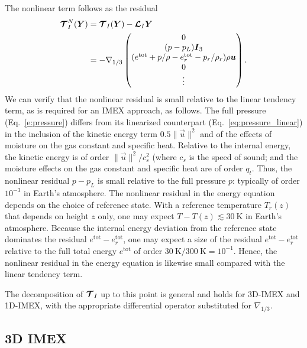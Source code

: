 \documentclass{report}
\begin{document}
The nonlinear term follows as the residual 
\begin{equation}\label{e:nonlinear_residual}
\begin{split}
\boldsymbol{{\mathcal{T}}}^N_{I}(\boldsymbol{{Y}}) & =  \boldsymbol{{\mathcal{T}}}_I(\boldsymbol{{Y}}) - \boldsymbol{{\mathcal{L}}}_I \boldsymbol{{Y}} \\
& = 
-\nabla_{1/3} \begin{pmatrix}
0 \\
(p - p_L) \boldsymbol{{I}}_3\\
(e^{\mathrm{tot}}  + p/\rho - e^{\mathrm{tot}}_r - p_r/\rho_r) \rho \boldsymbol{{u}}\\
0\\
\vdots
\end{pmatrix}.
\end{split}
\end{equation}
We can verify that the nonlinear residual is small relative to the linear tendency term, as is required for an IMEX approach, as follows. The full pressure (Eq.~\ref{e:pressure}) differs from its linearized counterpart (Eq.~\ref{eq:pressure_linear}) in the inclusion of the kinetic energy term $0.5 \|\vec{u} \|^2$ and of the effects of moisture on the gas constant and specific heat. Relative to the internal energy, the kinetic energy is of order $\|\vec{u}\|^2/c_s^2$ (where $c_s$ is the speed of sound; 
and the moisture effects on the gas constant and specific heat are of order $q_t$. Thus, the nonlinear residual $p-p_L$ is small relative to the full pressure $p$: typically of order $10^{-3}$ in Earth's atmosphere. The nonlinear residual in the energy equation depends on the choice of reference state. With a reference temperature $T_r(z)$ that depends on height $z$ only, one may expect $T - T(z) \lesssim 30~\mathrm{K}$ in Earth's atmosphere. Because the internal energy deviation from the reference state dominates the residual $e^{\mathrm{tot}} - e^{\mathrm{tot}}_r$, one may expect a size of the residual $e^{\mathrm{tot}} - e^{\mathrm{tot}}_r$ relative to the full total energy $e^{\mathrm{tot}}$ of order $30~\mathrm{K}/300~\mathrm{K} = 10^{-1}$. Hence, the nonlinear residual in the energy equation is likewise small compared with the linear tendency term. 
 
The decomposition of $\boldsymbol{{\mathcal{T}}}_I$ up to this point is general and holds for 3D-IMEX and 1D-IMEX, with the appropriate differential operator substituted for $\nabla_{1/3}$.

\subsection{3D IMEX}
\end{document}
